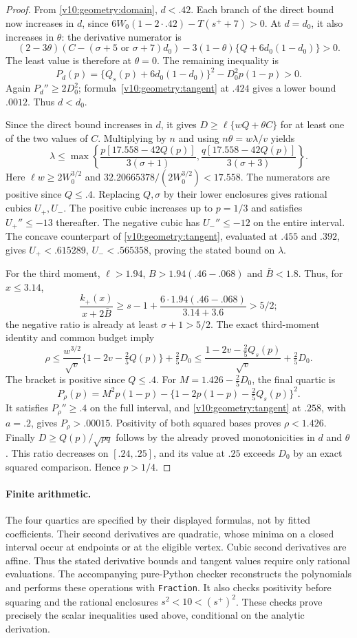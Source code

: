 \begin{proof}
From \eqref{v10:geometry:domain}, $d<.42$. Each branch of the direct
bound now increases in $d$, since
$6W_0(1-2\cdot.42)-T(s^++7)>0$.
At $d=d_0$, it also increases in $\theta$: the derivative numerator is
\[
 (2-3\theta)(C-(\sigma+5\text{ or }\sigma+7)d_0)
 -3(1-\theta)\{Q+6d_0(1-d_0)\}>0.
\]
The least value is therefore at $\theta=0$. The remaining inequality is
\[
 P_d(p)=\{Q_s(p)+6d_0(1-d_0)\}^2-D_0^2p(1-p)>0.
\]
Again $P_d''\ge2D_0^2$; formula~\eqref{v10:geometry:tangent} at $.424$
gives a lower bound $.0012$. Thus $d<d_0$.

Since the direct bound increases in $d$, it gives
$D\ge\ell\{wQ+\theta C\}$ for at least one of the two values of $C$.
Multiplying by $n$ and using $n\theta=w\lambda/v$ yields
\[
 \lambda\le\max\left\{
 \frac{p[17.558-42Q(p)]}{3(\sigma+1)},
 \frac{q[17.558-42Q(p)]}{3(\sigma+3)}\right\}.
\]
Here $\ell w\ge2W_0^{3/2}$ and
$32.20665378/(2W_0^{3/2})<17.558$.
The numerators are positive since $Q\le.4$. Replacing $Q,\sigma$ by
their lower enclosures gives rational cubics
$U_+,U_-$. The positive cubic increases up to $p=1/3$ and satisfies
$U_+''\le-13$ thereafter. The negative cubic has $U_-''\le-12$
on the entire interval. The concave counterpart of
\eqref{v10:geometry:tangent}, evaluated at $.455$ and $.392$, gives
$U_+<.615289$, $U_-<.565358$, proving the stated bound on $\lambda$.

For the third moment, $\ell>1.94$, $B>1.94(.46-.068)$ and
$\bar B<1.8$. Thus, for $x\le3.14$,
\[
 \frac{k_+(x)}{x+2\bar B}
 \ge s-1+\frac{6\cdot1.94(.46-.068)}{3.14+3.6}>5/2;
\]
the negative ratio is already at least $\sigma+1>5/2$.
The exact third-moment identity and common budget imply
\[
 \rho\le\frac{w^{3/2}}{\sqrt v}\{1-2v-\tfrac25Q(p)\}+\tfrac25D_0
 \le\frac{1-2v-\tfrac25Q_s(p)}{\sqrt v}+\tfrac25D_0.
\]
The bracket is positive since $Q\le.4$. For
$M=1.426-\tfrac25D_0$, the final quartic is
\[
 P_\rho(p)=M^2p(1-p)-\{1-2p(1-p)-\tfrac25Q_s(p)\}^2.
\]
It satisfies $P_\rho''\ge.4$ on the full interval, and
\eqref{v10:geometry:tangent} at $.258$, with $a=.2$, gives
$P_\rho>.00015$. Positivity of both squared bases proves $\rho<1.426$.
Finally $D\ge Q(p)/\sqrt{pq}$ follows by the already proved monotonicities
in $d$ and $\theta$. This ratio decreases on $[.24,.25]$, and its value
at $.25$ exceeds $D_0$ by an exact squared comparison. Hence $p>1/4$.
\end{proof}

\paragraph{Finite arithmetic.}
The four quartics are specified by their displayed formulas, not by fitted
coefficients. Their second derivatives are quadratic, whose minima on a
closed interval occur at endpoints or at the eligible vertex. Cubic second
derivatives are affine. Thus the stated derivative bounds and tangent
values require only rational evaluations. The accompanying pure-Python
checker reconstructs the polynomials and performs these operations with
\texttt{Fraction}. It also checks positivity before squaring and the
rational enclosures $s^2<10<(s^+)^2$. These checks prove precisely the
scalar inequalities used above, conditional on the analytic derivation.

